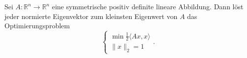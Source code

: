 
Sei $A:\mathbb R^n\to \mathbb R^n$ eine symmetrische positiv definite lineare Abbildung. Dann löst jeder normierte Eigenvektor zum kleinsten Eigenwert von $A$ das Optimierungsproblem $$\begin{cases}\min \frac{1}{2}\langle Ax, x\rangle\\\|x\|_2=1\end{cases}.$$